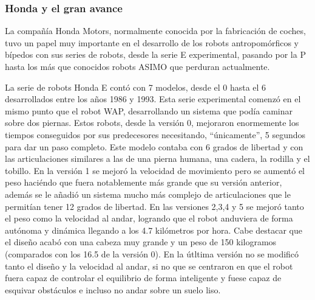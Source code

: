 \subsubsection{Honda y el gran avance}
La compañía Honda Motors, normalmente conocida por la fabricación de coches, tuvo un papel muy importante en el desarrollo de los robots antropomórficos y bípedos con sus series de robots, desde la serie E experimental, pasando por la P hasta los más que conocidos robots ASIMO que perduran actualmente.

\vspace{10px}

La serie de robots Honda E contó con 7 modelos, desde el 0 hasta el 6 desarrollados entre los años 1986 y 1993. Esta serie experimental comenzó en el mismo punto que el robot WAP, desarrollando un sistema que podía caminar sobre dos piernas. Estos robots, desde la versión 0, mejoraron enormemente los tiempos conseguidos por sus predecesores necesitando, ``únicamente'', 5 segundos para dar un paso completo. Este modelo contaba con 6 grados de libertad y con las articulaciones similares a las de una pierna humana, una cadera, la rodilla y el tobillo. En la versión 1 se mejoró la velocidad de movimiento pero se aumentó el peso haciéndo que fuera notablemente más grande que su versión anterior, además se le añadió un sistema mucho más complejo de articulaciones que le permitían tener 12 grados de libertad. En las versiones 2,3,4 y 5 se mejoró tanto el peso como la velocidad al andar, logrando que el robot anduviera de forma autónoma y dinámica llegando a los 4.7 kilómetros por hora. Cabe destacar que el diseño acabó con una cabeza muy grande y un peso de 150 kilogramos (comparados con los 16.5 de la versión 0). En la útltima versión no se modificó tanto el diseño y la velocidad al andar, si no que se centraron en que el robot fuera capaz de controlar el equilibrio de forma inteligente y fuese capaz de esquivar obstáculos e incluso no andar sobre un suelo liso.

\vspace{10px}

